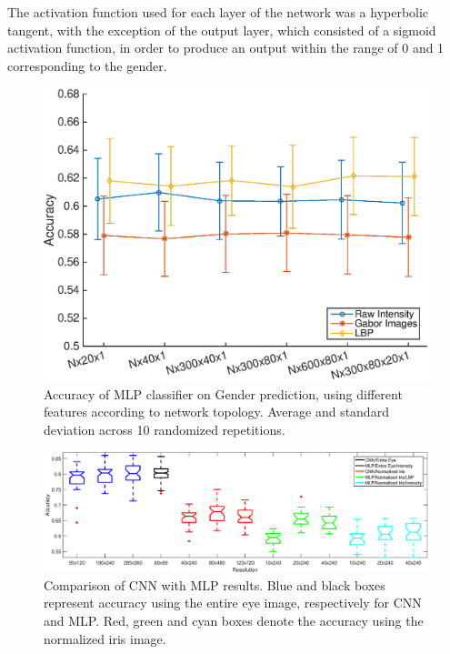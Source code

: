 \documentclass[10pt,twocolumn,letterpaper]{article}
\begin{document}
The activation function used for each layer of the network was a hyperbolic tangent, with the exception of the output layer, which consisted of a sigmoid activation function, in order to produce an output within the range of 0 and 1 corresponding to the gender.

\begin{figure}[!htbp]
    \centering
    \includegraphics[width=\linewidth]{img/iris_acc_comp_shape.eps}
    \caption{Accuracy of MLP classifier on Gender prediction, using different features according to network topology. Average and standard deviation across 10 randomized repetitions.}
    \label{fig:acccomparison}
\end{figure}

\begin{figure}[!htbp]
    \centering
    \includegraphics[width=\textwidth]{img/cnn_mlp_comparison.eps}
    \caption{Comparison of CNN with MLP results. Blue and black boxes represent accuracy using the entire eye image, respectively for CNN and MLP. Red, green and cyan boxes denote the accuracy using the normalized iris image.}
    \label{fig:fullimagecnn}
\end{figure}
\end{document}
